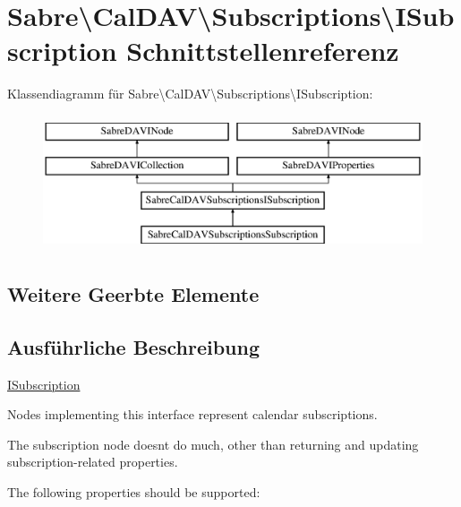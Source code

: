 \hypertarget{interface_sabre_1_1_cal_d_a_v_1_1_subscriptions_1_1_i_subscription}{}\section{Sabre\textbackslash{}Cal\+D\+AV\textbackslash{}Subscriptions\textbackslash{}I\+Subscription Schnittstellenreferenz}
\label{interface_sabre_1_1_cal_d_a_v_1_1_subscriptions_1_1_i_subscription}
Klassendiagramm für Sabre\textbackslash{}Cal\+D\+AV\textbackslash{}Subscriptions\textbackslash{}I\+Subscription\+:\begin{figure}[H]
\begin{center}
\leavevmode
\includegraphics[height=4.000000cm]{interface_sabre_1_1_cal_d_a_v_1_1_subscriptions_1_1_i_subscription}
\end{center}
\end{figure}
\subsection*{Weitere Geerbte Elemente}


\subsection{Ausführliche Beschreibung}
\mbox{\hyperlink{interface_sabre_1_1_cal_d_a_v_1_1_subscriptions_1_1_i_subscription}{I\+Subscription}}

Nodes implementing this interface represent calendar subscriptions.

The subscription node doesn\textquotesingle{}t do much, other than returning and updating subscription-\/related properties.

The following properties should be supported\+:


